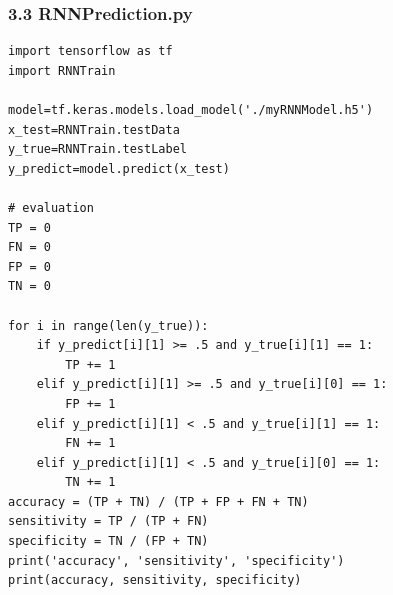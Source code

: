 \documentclass[12pt]{ctexart}
\begin{document}
\subsubsection*{3.3 RNNPrediction.py}
\begin{scriptsize}
\begin{verbatim}
import tensorflow as tf
import RNNTrain

model=tf.keras.models.load_model('./myRNNModel.h5')
x_test=RNNTrain.testData
y_true=RNNTrain.testLabel
y_predict=model.predict(x_test)

# evaluation
TP = 0
FN = 0
FP = 0
TN = 0

for i in range(len(y_true)):
    if y_predict[i][1] >= .5 and y_true[i][1] == 1:
        TP += 1
    elif y_predict[i][1] >= .5 and y_true[i][0] == 1:
        FP += 1
    elif y_predict[i][1] < .5 and y_true[i][1] == 1:
        FN += 1
    elif y_predict[i][1] < .5 and y_true[i][0] == 1:
        TN += 1
accuracy = (TP + TN) / (TP + FP + FN + TN)
sensitivity = TP / (TP + FN)
specificity = TN / (FP + TN)
print('accuracy', 'sensitivity', 'specificity')
print(accuracy, sensitivity, specificity)

\end{verbatim}
\end{scriptsize}
\end{document}

